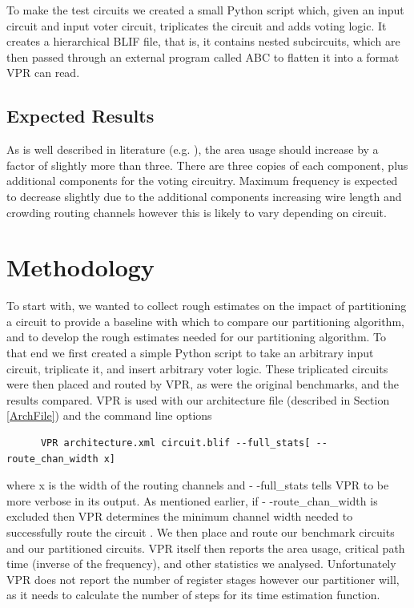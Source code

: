 \documentclass[12pt,final,oneside]{dwThesis} %
\begin{document}
   To make the test circuits we created a small Python script which, given an input circuit and input voter circuit, triplicates the circuit and adds voting logic. It creates a hierarchical \ac{BLIF} file, that is, it contains nested subcircuits, which are then passed through an external program called \ac{ABC}\cite{abc} to flatten it into a format \ac{VPR} can read.

   \subsection{Expected Results}
   As is well described in literature (e.g. \cite{HardeningTechniques}), the area usage should increase by a factor of slightly more than three. There are three copies of each component, plus additional components for the voting circuitry. Maximum frequency is expected to decrease slightly due to the additional components increasing wire length and crowding routing channels however this is likely to vary depending on circuit.
   \section{Methodology}\label{BenchmarkMethod}
   To start with, we wanted to collect rough estimates on the impact of partitioning a circuit to provide a baseline with which to compare our partitioning algorithm, and to develop the rough estimates needed for our partitioning algorithm. To that end we first created a simple Python script to take an arbitrary input circuit, triplicate it, and insert arbitrary voter logic. These triplicated circuits were then placed and routed by \ac{VPR}, as were the original benchmarks, and the results compared.
   \newpage
   \ac{VPR} is used with our architecture file (described in Section \ref{ArchFile}) and the command line options
   \begin{lstlisting}
      VPR architecture.xml circuit.blif --full_stats[ --route_chan_width x]
   \end{lstlisting} where x is the width of the routing channels and - -full\_stats tells \ac{VPR} to be more verbose in its output.
   As mentioned earlier, if - -route\_chan\_width is excluded then \ac{VPR} determines the minimum channel width needed to successfully route the circuit \cite{VPRManual}. We then place and route our benchmark circuits and our partitioned circuits. \ac{VPR} itself then reports the area usage, critical path time (inverse of the frequency), and other statistics we analysed. Unfortunately \ac{VPR} does not report the number of register stages however our partitioner will, as it needs to calculate the number of steps for its time estimation function.
\end{document}
